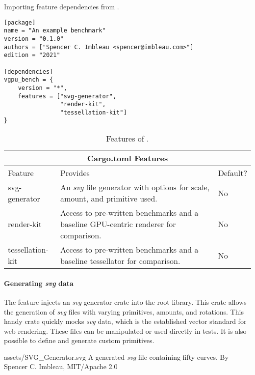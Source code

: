 \begin{snippet}
\caption{Importing feature dependencies from \toollinkedname.}\label{code:features}
\begin{verbatim}
[package]
name = "An example benchmark"
version = "0.1.0"
authors = ["Spencer C. Imbleau <spencer@imbleau.com>"]
edition = "2021"

[dependencies]
vgpu_bench = {
    version = "*", 
    features = ["svg-generator", 
                "render-kit", 
                "tessellation-kit"]
}
\end{verbatim}
\end{snippet}

\begin{table}[H]
\centering
\begin{tabular}{ |p{.2\mywidth}||p{.6\mywidth}|p{.1\mywidth}| }
\hline
\multicolumn{3}{|c|}{Cargo.toml Features}\\
\hline
Feature&Provides&Default?\\
\hline
svg-generator&An \textit{svg} file generator with options for scale, amount, and primitive used.&No\\
\hline
render-kit&Access to pre-written benchmarks and a baseline GPU-centric renderer for comparison.&No\\
\hline
tessellation-kit&Access to pre-written benchmarks and a baseline tessellator for comparison.&No\\
\hline
\end{tabular}
\caption{\label{tab:features}Features of \toollinkedname.}
\end{table}

\paragraph{Generating \textit{svg} data}\label{sec:svg-generator}
The  feature injects an \textit{svg} generator crate into the root library. This crate allows the generation of \textit{svg} files with varying primitives, amounts, and rotations. This handy crate quickly mocks \textit{svg} data, which is the established vector standard for web rendering. These files can be manipulated or used directly in tests. It is also possible to define and generate custom primitives.

\svg
{assets/SVG_Generator.svg}
{A generated \textit{svg} file containing fifty curves.}
{By Spencer C. Imbleau, MIT/Apache 2.0}


